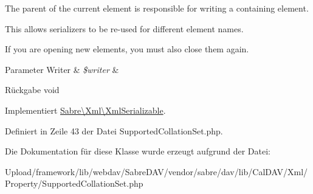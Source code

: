 The parent of the current element is responsible for writing a containing element.

This allows serializers to be re-\/used for different element names.

If you are opening new elements, you must also close them again.


\begin{DoxyParams}[1]{Parameter}
Writer & {\em \$writer} & \\
\hline
\end{DoxyParams}
\begin{DoxyReturn}{Rückgabe}
void 
\end{DoxyReturn}


Implementiert \mbox{\hyperlink{interface_sabre_1_1_xml_1_1_xml_serializable_aa78f3ee43aa699be8347181653a53d8c}{Sabre\textbackslash{}\+Xml\textbackslash{}\+Xml\+Serializable}}.



Definiert in Zeile 43 der Datei Supported\+Collation\+Set.\+php.



Die Dokumentation für diese Klasse wurde erzeugt aufgrund der Datei\+:\begin{DoxyCompactItemize}
\item 
Upload/framework/lib/webdav/\+Sabre\+D\+A\+V/vendor/sabre/dav/lib/\+Cal\+D\+A\+V/\+Xml/\+Property/Supported\+Collation\+Set.\+php\end{DoxyCompactItemize}
